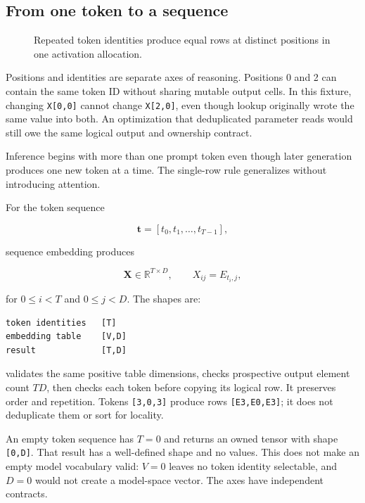 \documentclass[
  10pt,
]{article}
\begin{document}
\subsection{From one token to a
sequence}\label{from-one-token-to-a-sequence}

\begin{figure}[H]\centering\resizebox{\linewidth}{!}{}\caption{Repeated token identities produce equal rows at distinct positions in one activation allocation.}\end{figure}

Positions and identities are separate axes of reasoning. Positions 0 and
2 can contain the same token ID without sharing mutable output cells. In
this fixture, changing \texttt{X{[}0,0{]}} cannot change
\texttt{X{[}2,0{]}}, even though lookup originally wrote the same value
into both. An optimization that deduplicated parameter reads would still
owe the same logical output and ownership contract.

Inference begins with more than one prompt token even though later
generation produces one new token at a time. The single-row rule
generalizes without introducing attention.

For the token sequence

\[
\mathbf{t}=[t_0,t_1,\ldots,t_{T-1}],
\]

sequence embedding produces

\[
\mathbf{X}\in\mathbb{R}^{T\times D},
\qquad X_{ij}=E_{t_i,j},
\]

for \(0\le i<T\) and \(0\le j<D\). The shapes are:

\begin{verbatim}
token identities   [T]
embedding table    [V,D]
result             [T,D]
\end{verbatim}

\texttt{} validates the same
positive table dimensions, checks prospective output element count
\(TD\), then checks each token before copying its logical row. It
preserves order and repetition. Tokens \texttt{{[}3,0,3{]}} produce rows
\texttt{{[}E3,E0,E3{]}}; it does not deduplicate them or sort for
locality.

An empty token sequence has \(T=0\) and returns an owned tensor with
shape \texttt{{[}0,D{]}}. That result has a well-defined shape and no
values. This does not make an empty model vocabulary valid: \(V=0\)
leaves no token identity selectable, and \(D=0\) would not create a
model-space vector. The axes have independent contracts.
\end{document}
